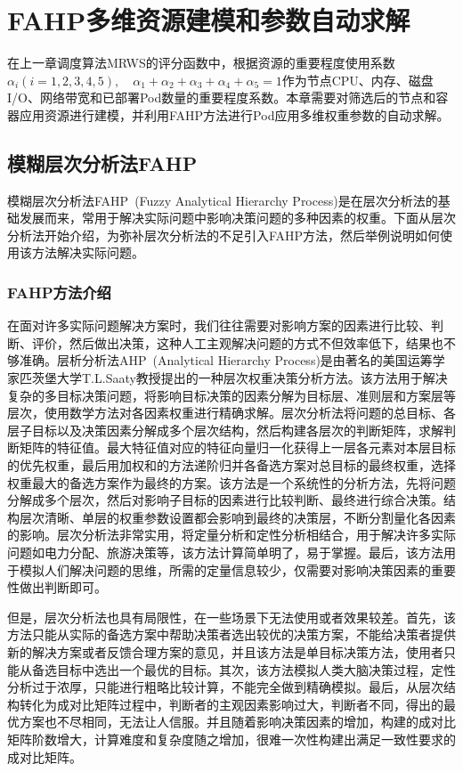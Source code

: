 \chapter{FAHP多维资源建模和参数自动求解}
在上一章调度算法MRWS的评分函数中，根据资源的重要程度使用系数$\alpha_{i}(i=1,2,3,4,5), \quad\alpha_{1}+\alpha_{2}+\alpha_{3}+\alpha_{4}+\alpha_{5}=1$作为节点CPU、内存、磁盘I/O、网络带宽和已部署Pod数量的重要程度系数。本章需要对筛选后的节点和容器应用资源进行建模，并利用FAHP方法进行Pod应用多维权重参数的自动求解。

\section{模糊层次分析法FAHP}
模糊层次分析法FAHP~\cite{Kwong2002A,Hong2013Cloud}(Fuzzy Analytical Hierarchy Process)是在层次分析法的基础发展而来，常用于解决实际问题中影响决策问题的多种因素的权重。下面从层次分析法开始介绍，为弥补层次分析法的不足引入FAHP方法，然后举例说明如何使用该方法解决实际问题。

\subsection{FAHP方法介绍}
在面对许多实际问题解决方案时，我们往往需要对影响方案的因素进行比较、判断、评价，然后做出决策，这种人工主观解决问题的方式不但效率低下，结果也不够准确。层析分析法AHP~\cite{Saaty1994How,Deng2012}(Analytical Hierarchy Process)是由著名的美国运筹学家匹茨堡大学T.L.Saaty教授提出的一种层次权重决策分析方法。该方法用于解决复杂的多目标决策问题，将影响目标决策的因素分解为目标层、准则层和方案层等层次，使用数学方法对各因素权重进行精确求解。层次分析法将问题的总目标、各层子目标以及决策因素分解成多个层次结构，然后构建各层次的判断矩阵，求解判断矩阵的特征值。最大特征值对应的特征向量归一化获得上一层各元素对本层目标的优先权重，最后用加权和的方法递阶归并各备选方案对总目标的最终权重，选择权重最大的备选方案作为最终的方案。该方法是一个系统性的分析方法，先将问题分解成多个层次，然后对影响子目标的因素进行比较判断、最终进行综合决策。结构层次清晰、单层的权重参数设置都会影响到最终的决策层，不断分割量化各因素的影响。层次分析法非常实用，将定量分析和定性分析相结合，用于解决许多实际问题如电力分配、旅游决策等，该方法计算简单明了，易于掌握。最后，该方法用于模拟人们解决问题的思维，所需的定量信息较少，仅需要对影响决策因素的重要性做出判断即可。

但是，层次分析法也具有局限性，在一些场景下无法使用或者效果较差。首先，该方法只能从实际的备选方案中帮助决策者选出较优的决策方案，不能给决策者提供新的解决方案或者反馈合理方案的意见，并且该方法是单目标决策方法，使用者只能从备选目标中选出一个最优的目标。其次，该方法模拟人类大脑决策过程，定性分析过于浓厚，只能进行粗略比较计算，不能完全做到精确模拟。最后，从层次结构转化为成对比矩阵过程中，判断者的主观因素影响过大，判断者不同，得出的最优方案也不尽相同，无法让人信服。并且随着影响决策因素的增加，构建的成对比矩阵阶数增大，计算难度和复杂度随之增加，很难一次性构建出满足一致性要求的成对比矩阵。

